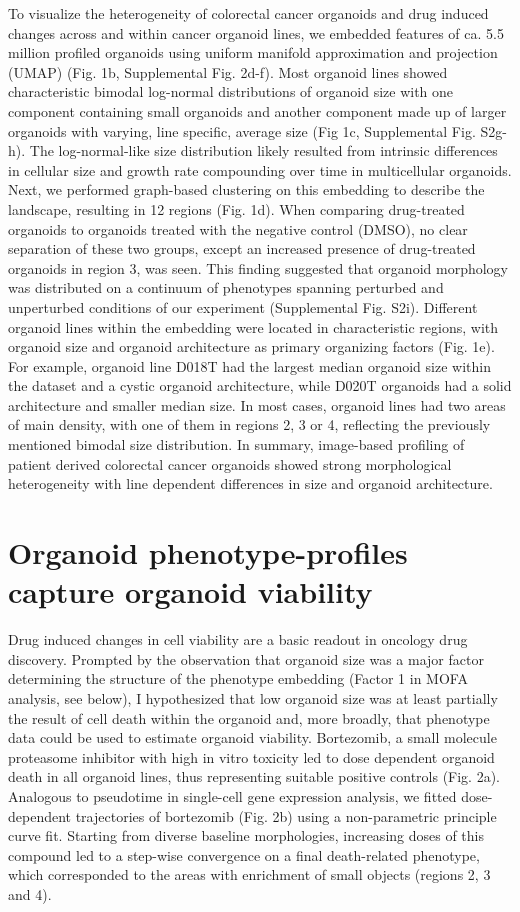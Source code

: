 \begin{flushleft}
To visualize the heterogeneity of colorectal cancer organoids and drug induced changes across and within cancer organoid lines, we embedded features of ca. 5.5 million profiled organoids using uniform manifold approximation and projection (UMAP) (Fig. 1b, Supplemental Fig. 2d-f). Most organoid lines showed characteristic bimodal log-normal distributions of organoid size with one component containing small organoids and another component made up of larger organoids with varying, line specific, average size (Fig 1c, Supplemental Fig. S2g-h). The log-normal-like size distribution likely resulted from intrinsic differences in cellular size and growth rate compounding over time in multicellular organoids. Next, we performed graph-based clustering on this embedding to describe the landscape, resulting in 12 regions (Fig. 1d). When comparing drug-treated organoids to organoids treated with the negative control (DMSO), no clear separation of these two groups, except an increased presence of drug-treated organoids in region 3,  was seen. This finding suggested that organoid morphology was distributed on a continuum of phenotypes spanning perturbed and unperturbed conditions of our experiment (Supplemental Fig. S2i). Different organoid lines within the embedding were located in characteristic regions, with organoid size and organoid architecture as primary organizing factors (Fig. 1e). For example, organoid line D018T had the largest median organoid size within the dataset and a cystic organoid architecture, while D020T organoids had a solid architecture and smaller median size. In most cases, organoid lines had two areas of main density, with one of them in regions 2, 3 or 4, reflecting the previously mentioned bimodal size distribution. In summary, image-based profiling of patient derived colorectal cancer organoids showed strong morphological heterogeneity with line dependent differences in size and organoid architecture.

\section{Organoid phenotype-profiles capture organoid viability}

Drug induced changes in cell viability are a basic readout in oncology drug discovery. Prompted by the observation that organoid size was a major factor determining the structure of the phenotype embedding (Factor 1 in MOFA analysis, see below), I hypothesized that low organoid size was at least partially the result of cell death within the organoid and, more broadly, that phenotype data could be used to estimate organoid viability. Bortezomib, a small molecule proteasome inhibitor with high in vitro toxicity led to dose dependent organoid death in all organoid lines, thus representing suitable positive controls (Fig. 2a). Analogous to pseudotime in single-cell  gene expression analysis, we fitted dose-dependent trajectories of bortezomib (Fig. 2b) using a non-parametric principle curve fit. Starting from diverse baseline morphologies, increasing doses of this compound led to a step-wise convergence on a final death-related phenotype, which corresponded to the areas with enrichment of small objects (regions 2, 3 and 4). 


\end{flushleft}
